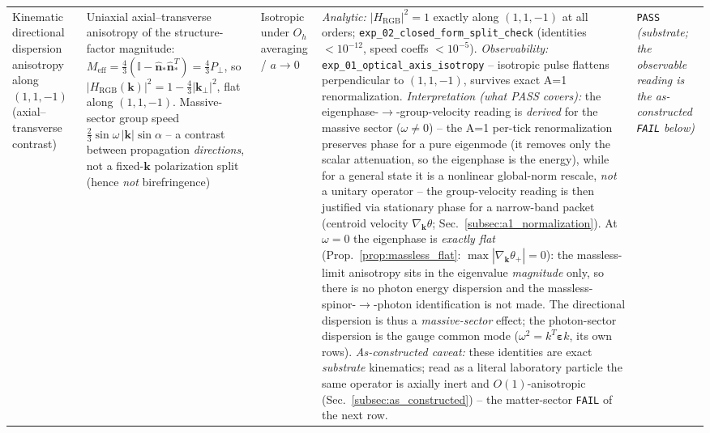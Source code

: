 {\begin{longtable}{@{}p{2.6cm}p{3.8cm}p{3.2cm}p{4.4cm}p{1.0cm}@{}}
Kinematic directional dispersion anisotropy along $(1,1,-1)$ (axial--transverse contrast)
    & Uniaxial axial--transverse anisotropy of the structure-factor magnitude: $M_\text{eff} = \tfrac43(\mathbb{I}-\hat{\mathbf{n}}_*\hat{\mathbf{n}}_*^T) = \tfrac43 P_\perp$, so $|H_\text{RGB}(\mathbf{k})|^2 = 1-\tfrac43|\mathbf{k}_\perp|^2$, flat along $(1,1,-1)$. Massive-sector group speed $\tfrac23\sin\omega\,|\mathbf{k}|\sin\alpha$ -- a contrast between propagation \emph{directions}, not a fixed-$\mathbf{k}$ polarization split (hence \emph{not} birefringence)
    & Isotropic under $O_h$ averaging / $a\to 0$
    & \emph{Analytic:} $|H_\text{RGB}|^2 = 1$ exactly along $(1,1,-1)$ at all orders; \texttt{exp\_02\_closed\_form\_split\_check} (identities $<10^{-12}$, speed coeffs $<10^{-5}$). \emph{Observability:} \texttt{exp\_01\_optical\_axis\_isotropy} -- isotropic pulse flattens perpendicular to $(1,1,-1)$, survives exact A=1 renormalization. \emph{Interpretation (what PASS covers):} the eigenphase-$\to$-group-velocity reading is \emph{derived} for the massive sector ($\omega\neq0$) -- the A=1 per-tick renormalization preserves phase for a pure eigenmode (it removes only the scalar attenuation, so the eigenphase is the energy), while for a general state it is a nonlinear global-norm rescale, \emph{not} a unitary operator -- the group-velocity reading is then justified via stationary phase for a narrow-band packet (centroid velocity $\nabla_{\mathbf{k}}\theta$; Sec.~\ref{subsec:a1_normalization}). At $\omega=0$ the eigenphase is \emph{exactly flat} (Prop.~\ref{prop:massless_flat}: $\max|\nabla_{\mathbf{k}}\theta_+|=0$): the massless-limit anisotropy sits in the eigenvalue \emph{magnitude} only, so there is no photon energy dispersion and the massless-spinor-$\to$-photon identification is not made. The directional dispersion is thus a \emph{massive-sector} effect; the photon-sector dispersion is the gauge common mode ($\omega^2=k^T\boldsymbol\varepsilon k$, its own rows). \emph{As-constructed caveat:} these identities are exact \emph{substrate} kinematics; read as a literal laboratory particle the same operator is axially inert and $O(1)$-anisotropic (Sec.~\ref{subsec:as_constructed}) -- the matter-sector \texttt{FAIL} of the next row.
    & \texttt{PASS} \emph{(substrate; the observable reading is the as-constructed \texttt{FAIL} below)} \\


\end{longtable}}
